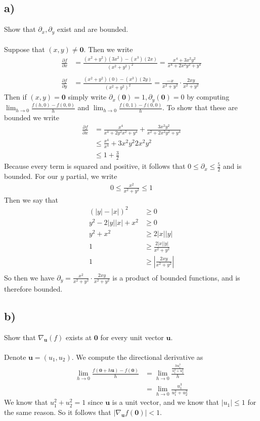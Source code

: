 \documentclass{article}
\theoremstyle{definition}
\begin{document}
\subsection*{a)}
Show that $\partial_x, \partial_y$ exist and are bounded.\\\\
Suppose that $(x,y) \neq \bm 0$. Then we write 
\begin{align*}
    \frac{\partial f}{\partial x} & = \frac{(x^2 + y^2)(3x^2) - (x^3)(2x)}{(x^2 + y^2)^2} = \frac{x^4 + 3x^2y^2}{x^4 + 2x^2y^2 + y^4} \\\\
    \frac{\partial f}{\partial y} & = \frac{(x^2 + y^2)(0) - (x^3)(2y)}{(x^2 + y^2)^2} = \frac{-x}{x^2+y^2}\cdot\frac{2xy}{x^2+y^2}
\end{align*}
Then if $(x,y) = \bm 0$ simply write $\partial_x(\bm 0) = 1, \partial_y(\bm 0) = 0$ by computing $\lim_{h\rightarrow 0}\frac{f(h,0) - f(0,0)}{h}$ and  $\lim_{h\rightarrow 0}\frac{f(0,1) - f(0,0)}{h}$. To show that these are bounded we write 
\begin{align*}
    \frac{\partial f}{\partial x} &= \frac{x^4}{x^4 + 2y^2x^2 + y^4} + \frac{3x^2y^2}{x^2 + 2x^2y^2 + y^4}\\
    &\leqslant \frac{x^4}{x^4} + {3x^2y^2}{2x^2y^2} \\
    &\leqslant 1 + \frac{3}{2}
\end{align*}
Because every term is squared and positive, it follows that $0 \leqslant \partial_x \leqslant \frac{5}{2}$ and is bounded.
For our $y$ partial, we write
\begin{align*}
    0 \leqslant \frac{x^2}{x^2 + y^2} \leqslant 1
\end{align*}
Then we say that 
\begin{align*}
    (|y| - |x|)^2 & \geqslant 0 \\
    y^2 - 2|y||x| + x^2 &\geqslant 0 \\
    y^2 + x^2 &\geqslant 2|x||y| \\
    1 &\geqslant \frac{2|x||y|}{x^2+y^2} \\
    1 &\geqslant \left|\frac{2xy}{x^2+y^2}\right| \\
\end{align*}
So then we have $\partial_y = \frac{x^2}{x^2 + y^2} \cdot \frac{2xy}{x^2 + y^2}$ is a product of bounded functions, and is therefore bounded.
\subsection*{b)}
Show that $\nabla_{\bm u}(f)$ exists at $\bm 0$ for every unit vector $\bm u$.\\\\
Denote $\bm u = (u_1,u_2)$. We compute the directional derivative as 
\begin{align*}
    \lim_{h \rightarrow 0} \frac{f(\bm 0 + h \bm u) - f(\bm 0)}{h} &= \lim_{h \rightarrow 0} \frac{\frac{hu_1^3}{u_1^2 + u_2^2}}{h} \\
    &= \lim_{h \rightarrow 0} \frac{u_1^3}{u_1^2 + u_2^2}
\end{align*}
We know that $u_1^2 + u_2^2 = 1$ since $\bm u$ is a unit vector, and we know that $|u_1| \leqslant 1$ for the same reason.
So it follows that $|\nabla_{\bm u}f(\bm 0)| < 1$.
\end{document}
